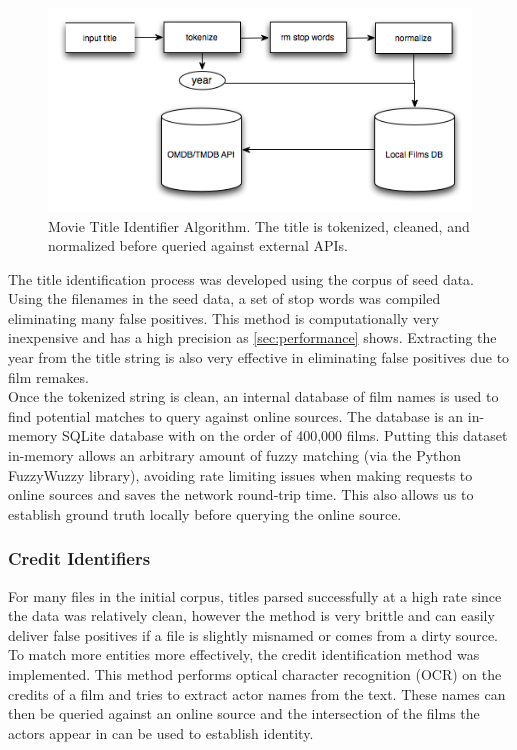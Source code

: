 \documentclass[paper=a4, fontsize=11pt]{scrartcl} %
\numberwithin{equation}{section} %
\numberwithin{figure}{section} %
\numberwithin{table}{section} %
\begin{document}
\begin{figure}[H]
\center\includegraphics[scale=0.90]{title-identifier.png}
\caption{Movie Title Identifier Algorithm. The title is tokenized, cleaned, and normalized before queried against external APIs.}
\label{fig:title-identifier}
\end{figure}


The title identification process was developed using the corpus of seed data. Using the filenames in the seed data, a set of stop words was compiled eliminating many false positives. This method is computationally very inexpensive and has a high precision as \ref{sec:performance} shows. Extracting the year from the title string is also very effective in eliminating false positives due to film remakes. \\

Once the tokenized string is clean, an internal database of film names is used to find potential matches to query against online sources. The database is an in-memory SQLite database with on the order of 400,000 films. Putting this dataset in-memory allows an arbitrary amount of fuzzy matching (via the Python FuzzyWuzzy library), avoiding rate limiting issues when making requests to online sources and saves the network round-trip time. This also allows us to establish ground truth locally before querying the online source. \\

\subsubsection{Credit Identifiers}
\label{sec:credit-identifier}

For many files in the initial corpus, titles parsed successfully at a high rate since the data was relatively clean, however the method is very brittle and can easily deliver false positives if a file is slightly misnamed or comes from a dirty source. To match more entities more effectively, the credit identification method was implemented. This method performs optical character recognition (OCR) on the credits of a film and tries to extract actor names from the text. These names can then be queried against an online source and the intersection of the films the actors appear in can be used to establish identity. \\
\end{document}
